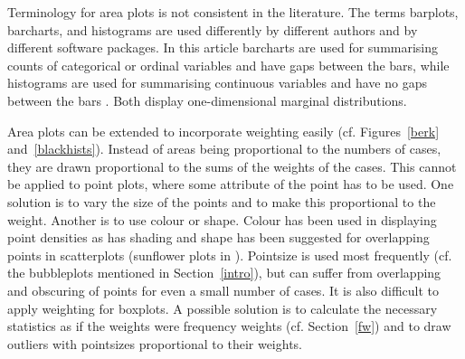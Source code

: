 \documentclass{svmult}
\begin{document}
Terminology for area plots is not consistent in the literature.  The terms barplots, barcharts, and histograms are used differently by different authors and by different software packages.  In this article barcharts are used for summarising counts of categorical or ordinal variables and have gaps between the bars, while histograms are used for summarising continuous variables and have no gaps between the bars \citep{unwin:2006}.  Both display one-dimensional marginal distributions.

Area plots can be extended to incorporate weighting easily (cf. Figures~\ref{berk} and~\ref{blackhists}).  Instead of areas being proportional to the numbers of cases, they are drawn proportional to the sums of the weights of the cases.  This cannot be applied to point plots, where some attribute of the point has to be used.  One solution is to vary the size of the points and to make this proportional to the weight.  Another is to use colour or shape.  Colour has been used in displaying point densities \citep{carr:1987} as has shading \citep{hofmann:2000a} and shape has been suggested for overlapping points in scatterplots (sunflower plots in \cite{cleveland:1984}).  Pointsize is used most frequently (cf. the bubbleplots mentioned in Section~\ref{intro}), but can suffer from overlapping and obscuring of points for even a small number of cases.  It is also difficult to apply weighting for boxplots.  A possible solution is to calculate the necessary statistics as if the weights were frequency weights (cf. Section~\ref{fw}) and to draw outliers with pointsizes proportional to their weights.
\end{document}
